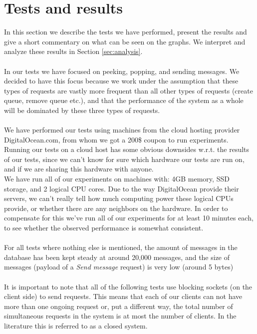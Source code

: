\documentclass{article}
\begin{document}
    \section{Tests and results}
        \label{sec:tests_and_results}
        In this section we describe the tests we have performed, present the results and give a short commentary on what can be seen on the graphs. We interpret and analyze these results in Section \ref{sec:analysis}.\\
        \\
        In our tests we have focused on peeking, popping, and sending messages. We decided to have this focus because we work under the assumption that these types of requests are vastly more frequent than all other types of requests (create queue, remove queue etc.), and that the performance of the system as a whole will be dominated by these three types of requests.\\
        \\
        We have performed our tests using machines from the cloud hosting provider DigitalOcean.com, from whom we got a 200\$ coupon to run experiments. Running our tests on a cloud host has some obvious downsides w.r.t. the results of our tests, since we can't know for sure which hardware our tests are run on, and if we are sharing this hardware with anyone.\\
        We have run all of our experiments on machines with: 4GB memory, SSD storage, and 2 logical CPU cores. Due to the way DigitalOcean provide their servers, we can't really tell how much computing power these logical CPUs provide, or whether there are any neighbors on the hardware. In order to compensate for this we've run all of our experiments for at least 10 minutes each, to see whether the observed performance is somewhat consistent.\\
        \\
        For all tests where nothing else is mentioned, the amount of messages in the database has been kept steady at around 20,000 messages, and the size of messages (payload of a \textit{Send message} request) is very low (around 5 bytes)\\
        \\
        It is important to note that all of the following tests use blocking sockets (on the client side) to send requests. This means that each of our clients can not have more than one ongoing request or, put a different way, the total number of simultaneous requests in the system is at most the number of clients. In the literature this is referred to as a closed system.\\
\end{document}
